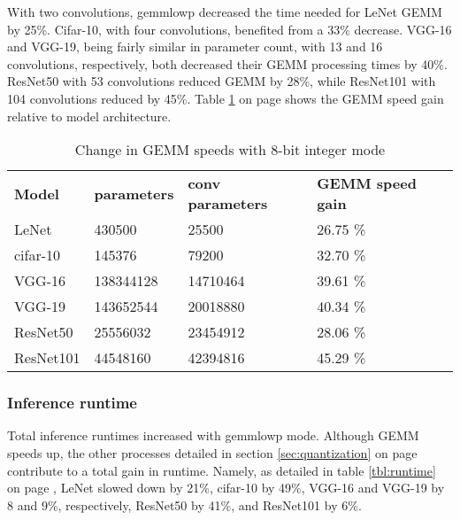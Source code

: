 With two convolutions, gemmlowp decreased the time needed for LeNet GEMM by 25\%. Cifar-10, with four convolutions, benefited from a 33\% decrease. VGG-16 and VGG-19, being fairly similar in parameter count, with 13 and 16 convolutions, respectively, both decreased their GEMM processing times by 40\%. ResNet50 with 53 convolutions reduced GEMM by 28\%, while ResNet101 with 104 convolutions reduced by 45\%. Table \ref{tbl:gains} on page \pageref{tbl:gains} shows the GEMM speed gain relative to model architecture.

\begin{table}[]
\centering
\caption[GEMM speed gains]{Change in GEMM speeds with 8-bit integer mode}
\label{tbl:gains}
\begin{tabular}{llll}
\textbf{Model}     & \textbf{parameters} & \textbf{conv parameters} & \textbf{GEMM speed gain} \\
LeNet     & 430500              & 25500                    & 26.75 \%                  \\
cifar-10  & 145376              & 79200                    & 32.70 \%                  \\
VGG-16    & 138344128           & 14710464                 & 39.61 \%                  \\
VGG-19    & 143652544           & 20018880                 & 40.34 \%                  \\
ResNet50  & 25556032            & 23454912                 & 28.06 \%                  \\
ResNet101 & 44548160            & 42394816                 & 45.29 \%                 
\end{tabular}
\end{table}

\subsubsection{Inference runtime}
Total inference runtimes increased with gemmlowp mode. Although GEMM speeds up, the other processes detailed in section \ref{sec:quantization} on page \pageref{sec:quantization} contribute to a total gain in runtime. Namely, as detailed in table \ref{tbl:runtime} on page \pageref{tbl:runtime}, LeNet slowed down by 21\%, cifar-10 by 49\%, VGG-16 and VGG-19 by 8 and 9\%, respectively, ResNet50 by 41\%, and ResNet101 by 6\%.

